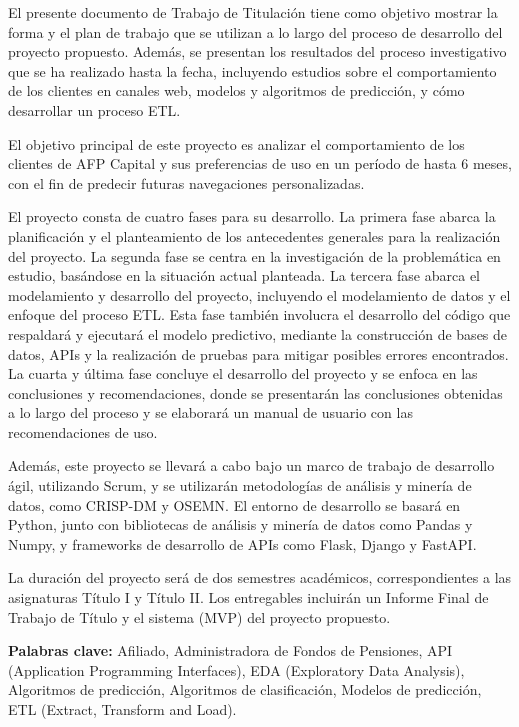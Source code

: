 El presente documento de Trabajo de Titulación tiene como objetivo mostrar la forma y el plan de trabajo que se utilizan a lo largo del proceso de desarrollo del proyecto propuesto. Además, se presentan los resultados del proceso investigativo que se ha realizado hasta la fecha, incluyendo estudios sobre el comportamiento de los clientes en canales web, modelos y algoritmos de predicción, y cómo desarrollar un proceso ETL.

El objetivo principal de este proyecto es analizar el comportamiento de los clientes de AFP Capital y sus preferencias de uso en un período de hasta 6 meses, con el fin de predecir futuras navegaciones personalizadas.

El proyecto consta de cuatro fases para su desarrollo. La primera fase abarca la planificación y el planteamiento de los antecedentes generales para la realización del proyecto. La segunda fase se centra en la investigación de la problemática en estudio, basándose en la situación actual planteada. La tercera fase abarca el modelamiento y desarrollo del proyecto, incluyendo el modelamiento de datos y el enfoque del proceso ETL. Esta fase también involucra el desarrollo del código que respaldará y ejecutará el modelo predictivo, mediante la construcción de bases de datos, APIs y la realización de pruebas para mitigar posibles errores encontrados. La cuarta y última fase concluye el desarrollo del proyecto y se enfoca en las conclusiones y recomendaciones, donde se presentarán las conclusiones obtenidas a lo largo del proceso y se elaborará un manual de usuario con las recomendaciones de uso.

Además, este proyecto se llevará a cabo bajo un marco de trabajo de desarrollo ágil, utilizando Scrum, y se utilizarán metodologías de análisis y minería de datos, como CRISP-DM y OSEMN. El entorno de desarrollo se basará en Python, junto con bibliotecas de análisis y minería de datos como Pandas y Numpy, y frameworks de desarrollo de APIs como Flask, Django y FastAPI.

La duración del proyecto será de dos semestres académicos, correspondientes a las asignaturas Título I y Título II. Los entregables incluirán un Informe Final de Trabajo de Título y el sistema (MVP) del proyecto propuesto.

\textbf{Palabras clave:}  Afiliado, Administradora de Fondos de Pensiones, API (Application Programming Interfaces), EDA (Exploratory Data Analysis), Algoritmos de predicción, Algoritmos de clasificación, Modelos de predicción, ETL (Extract, Transform and Load).
